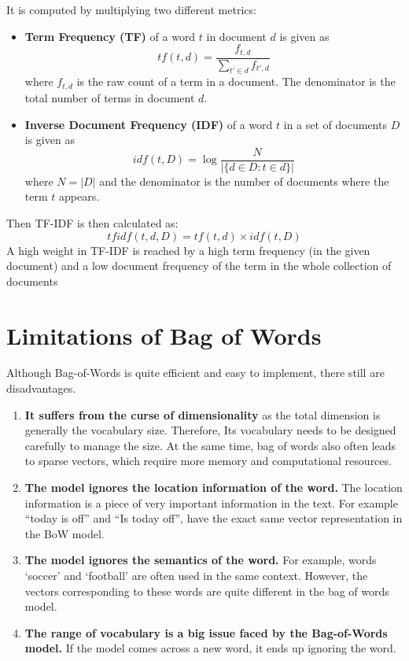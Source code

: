 \documentclass[
]{book}
\begin{document}
It is computed by multiplying two different metrics:

\begin{itemize}
\item
  \textbf{Term Frequency (TF)} of a word \(t\) in document \(d\) is given as
  \[
  tf(t,d) = \frac{f_{t,d}}{\sum_{t'\in d} f_{t',d}}
  \]
  where \(f_{t,d}\) is the raw count of a term in a document. The denominator is the total number of terms in document \(d\).
\item
  \textbf{Inverse Document Frequency (IDF)} of a word \(t\) in a set of documents \(D\) is given as
  \[
  idf(t,D) = \log\frac{N}{|\{d\in D:t\in d\}|}
  \]
  where \(N=|D|\) and the denominator is the number of documents where the term \(t\) appears.
\end{itemize}

Then TF-IDF is then calculated as:
\[
tfidf(t,d,D) = tf(t,d)\times idf(t,D)
\]
A high weight in TF-IDF is reached by a high term frequency (in the given document) and a low document frequency of the term in the whole collection of documents

\hypertarget{limitations-of-bag-of-words}{%
\section{Limitations of Bag of Words}\label{limitations-of-bag-of-words}}

Although Bag-of-Words is quite efficient and easy to implement, there still are disadvantages.

\begin{enumerate}
\def\labelenumi{\arabic{enumi}.}
\item
  \textbf{It suffers from the curse of dimensionality} as the total dimension is generally the vocabulary size. Therefore, Its vocabulary needs to be designed carefully to manage the size. At the same time, bag of words also often leads to sparse vectors, which require more memory and computational resources.
\item
  \textbf{The model ignores the location information of the word.} The location information is a piece of very important information in the text. For example ``today is off'' and ``Is today off'', have the exact same vector representation in the BoW model.
\item
  \textbf{The model ignores the semantics of the word.} For example, words `soccer' and `football' are often used in the same context. However, the vectors corresponding to these words are quite different in the bag of words model.
\item
  \textbf{The range of vocabulary is a big issue faced by the Bag-of-Words model.} If the model comes across a new word, it ends up ignoring the word.
\end{enumerate}
\end{document}
